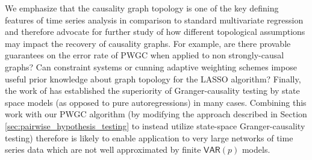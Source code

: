 \documentclass{statsoc}
\def\VAR{\mathsf{VAR}}  %
\begin{document}
We emphasize that the causality graph topology is one of the key
defining features of time series analysis in comparison to standard
multivariate regression and therefore advocate for further study of
how different topological assumptions may impact the recovery of
causality graphs.  For example, are there provable guarantees on the
error rate of PWGC when applied to non strongly-causal graphs?  Can
constraint systems or cunning adaptive weighting schemes impose useful
prior knowledge about graph topology for the LASSO algorithm?
Finally, the work of \cite{barnett2015granger} has established the
superiority of Granger-causality testing by state space models (as
opposed to pure autoregressions) in many cases.  Combining this work
with our PWGC algorithm (by modifying the approach described in
Section \ref{sec:pairwise_hypothesis_testing} to instead utilize
state-space Granger-causality testing) therefore is likely to enable
application to very large networks of time series data which are not
well approximated by finite $\VAR(p)$ models.

% 

\end{document}
